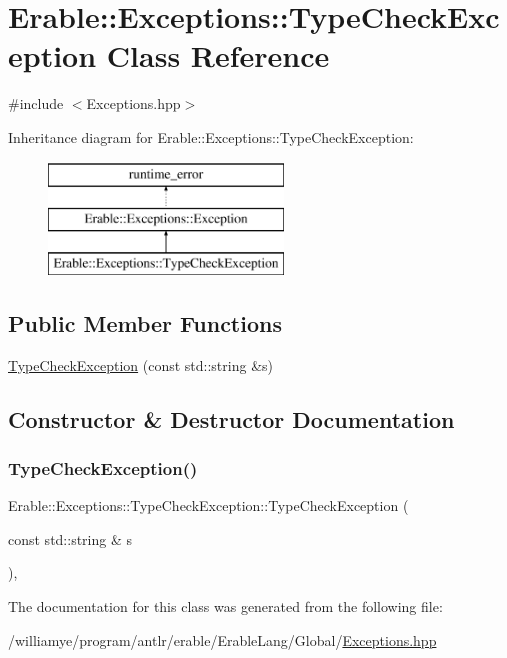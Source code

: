 \hypertarget{class_erable_1_1_exceptions_1_1_type_check_exception}{}\section{Erable\+::Exceptions\+::Type\+Check\+Exception Class Reference}
\label{class_erable_1_1_exceptions_1_1_type_check_exception}


{\ttfamily \#include $<$Exceptions.\+hpp$>$}

Inheritance diagram for Erable\+::Exceptions\+::Type\+Check\+Exception\+:\begin{figure}[H]
\begin{center}
\leavevmode
\includegraphics[height=3.000000cm]{class_erable_1_1_exceptions_1_1_type_check_exception}
\end{center}
\end{figure}
\subsection*{Public Member Functions}
\begin{DoxyCompactItemize}
\item 
\mbox{\hyperlink{class_erable_1_1_exceptions_1_1_type_check_exception_a70e175531b408631aa6f9a859439475f}{Type\+Check\+Exception}} (const std\+::string \&s)
\end{DoxyCompactItemize}


\subsection{Constructor \& Destructor Documentation}
\mbox{\label{class_erable_1_1_exceptions_1_1_type_check_exception_a70e175531b408631aa6f9a859439475f}} 
\subsubsection{\texorpdfstring{TypeCheckException()}{TypeCheckException()}}
{\footnotesize\ttfamily Erable\+::\+Exceptions\+::\+Type\+Check\+Exception\+::\+Type\+Check\+Exception (\begin{DoxyParamCaption}\item[{const std\+::string \&}]{s }\end{DoxyParamCaption})\hspace{0.3cm}{\ttfamily [inline]}, {\ttfamily [explicit]}}



The documentation for this class was generated from the following file\+:\begin{DoxyCompactItemize}
\item 
/williamye/program/antlr/erable/\+Erable\+Lang/\+Global/\mbox{\hyperlink{_exceptions_8hpp}{Exceptions.\+hpp}}\end{DoxyCompactItemize}
